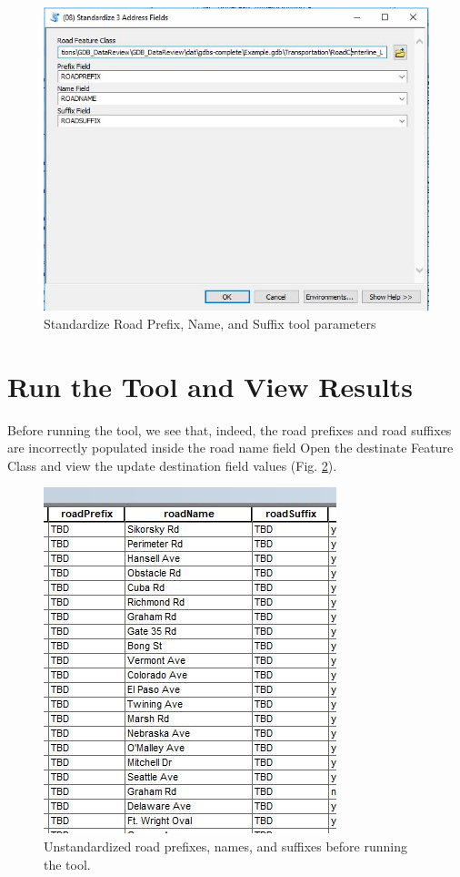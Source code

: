 \documentclass[openany]{book}
\theoremstyle{definition}
\theoremstyle{definition}
\theoremstyle{definition}
\theoremstyle{remark}
\begin{document}
\begin{figure}[H]

{\centering \includegraphics{figures/std3-toolparams} 

}

\caption{Standardize Road Prefix, Name, and Suffix tool parameters}\label{fig:std3params}
\end{figure}

\section{Run the Tool and View
Results}\label{run-the-tool-and-view-results-7}

Before running the tool, we see that, indeed, the road prefixes and road
suffixes are incorrectly populated inside the road name field Open the
destinate Feature Class and view the update destination field values
(Fig. \ref{fig:std3before}).

\begin{figure}[H]

{\centering \includegraphics{figures/std3-before} 

}

\caption{Unstandardized road prefixes, names, and suffixes before running the tool.}\label{fig:std3before}
\end{figure}
\end{document}
